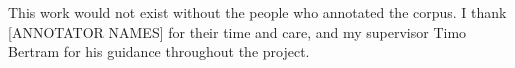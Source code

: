 
\cleardoubleoddpage%
\begin{acks*}
This work would not exist without the people who annotated the corpus. I thank
[ANNOTATOR NAMES] for their time and care, and my supervisor Timo Bertram for his
guidance throughout the project.
\end{acks*}

